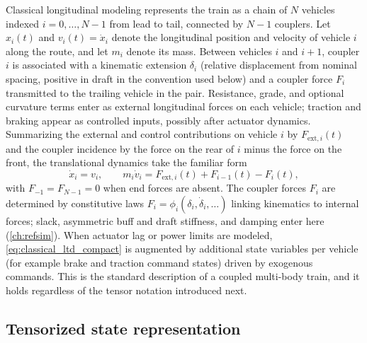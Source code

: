 Classical longitudinal modeling represents the train as a chain of $N$ vehicles indexed $i=0,\ldots,N-1$ from lead to tail, connected by $N-1$ couplers.
Let $x_i(t)$ and $v_i(t)=\dot{x}_i$ denote the longitudinal position and velocity of vehicle $i$ along the route, and let $m_i$ denote its mass.
Between vehicles $i$ and $i+1$, coupler $i$ is associated with a kinematic extension $\delta_i$ (relative displacement from nominal spacing, positive in draft in the convention used below) and a coupler force $F_i$ transmitted to the trailing vehicle in the pair.
Resistance, grade, and optional curvature terms enter as external longitudinal forces on each vehicle; traction and braking appear as controlled inputs, possibly after actuator dynamics.
Summarizing the external and control contributions on vehicle $i$ by $F_{\mathrm{ext},i}(t)$ and the coupler incidence by the force on the rear of $i$ minus the force on the front, the translational dynamics take the familiar form
\begin{equation}
    \dot{x}_i = v_i, \qquad
    m_i \dot{v}_i = F_{\mathrm{ext},i}(t) + F_{i-1}(t) - F_i(t),
    \label{eq:classical_ltd_compact}
\end{equation}
with $F_{-1}=F_{N-1}=0$ when end forces are absent.
The coupler forces $F_i$ are determined by constitutive laws $F_i = \phi_i(\delta_i,\dot{\delta}_i,\ldots)$ linking kinematics to internal forces; slack, asymmetric buff and draft stiffness, and damping enter here (\cref{ch:refsim}).
When actuator lag or power limits are modeled, \cref{eq:classical_ltd_compact} is augmented by additional state variables per vehicle (for example brake and traction command states) driven by exogenous commands.
This is the standard description of a coupled multi-body train, and it holds regardless of the tensor notation introduced next.

\subsection{Tensorized state representation}
\label{sec:tensor_state_rep}

